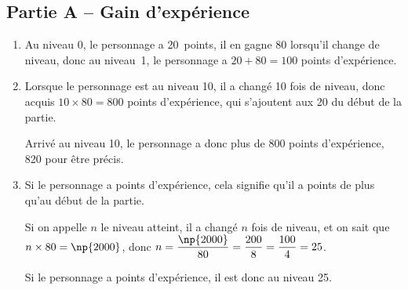 \subsection*{Partie A -- Gain d'expérience}
\begin{enumerate}
	\item Au niveau 0, le personnage a 20~points, il en gagne 80 lorsqu'il change de niveau, donc au niveau~1, le personnage a $20+80 = 100$ points d'expérience.

	\item Lorsque le personnage est au niveau 10, il a changé 10 fois de niveau, donc acquis $10\times80 = 800$ points d'expérience, qui s'ajoutent aux 20 du début de la partie.

	Arrivé au niveau 10, le personnage a donc plus de 800 points d'expérience, 820 pour être précis.

	\item Si le personnage a  points d'expérience, cela signifie qu'il a  points de plus qu'au début de la partie.

	Si on appelle $n$ le niveau atteint, il a changé $n$ fois de niveau, et on sait que \quad $n\times 80 = \np{2000}$, \quad donc $n = \dfrac{\np{2000}}{80} = \dfrac{200}{8} = \dfrac{100}{4} = 25$.

	Si le personnage a  points d'expérience, il est donc au niveau 25.
\end{enumerate}

